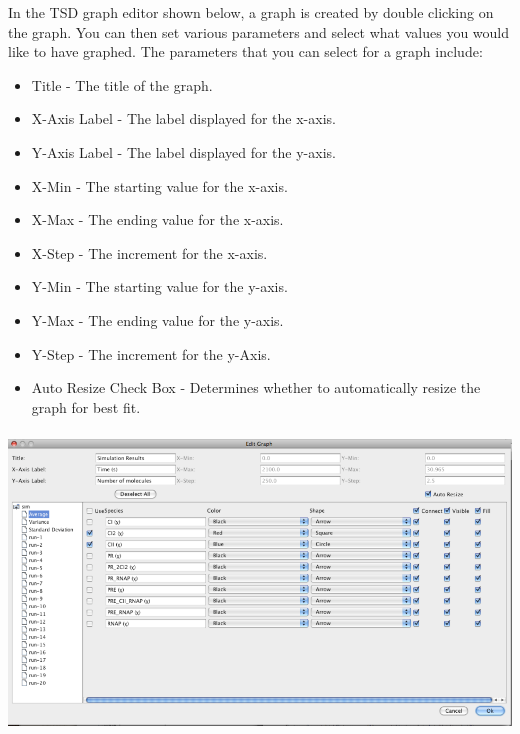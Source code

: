 \documentclass[titlepage,11pt]{article}
\begin{document}
In the TSD graph editor shown below,
a graph is created by double clicking on the graph. You can then set
various parameters and select what values you would like to have
graphed. The parameters that you can select for a graph include: 
\begin{itemize}
\item Title - The title of the graph.
\item X-Axis Label - The label displayed for the x-axis. 
\item Y-Axis Label - The label displayed for the y-axis. 
\item X-Min - The starting value for the x-axis. 
\item X-Max - The ending value for the x-axis. 
\item X-Step - The increment for the x-axis. 
\item Y-Min - The starting value for the y-axis. 
\item Y-Max - The ending value for the y-axis. 
\item Y-Step - The increment for the y-Axis. 
\item Auto Resize Check Box -
Determines whether to automatically resize the graph for best fit. 
\end{itemize}
\begin{center}
\includegraphics[height=80mm]{screenshots/editGraph}
\end{center}
\end{document}
